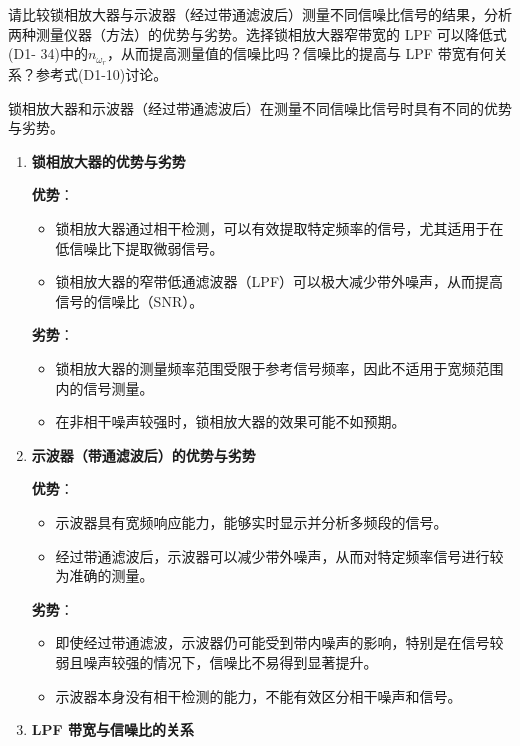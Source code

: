\documentclass[dvipsnames, svgnames,a4paper,11pt]{article}
\begin{document}
\begin{question}
	请比较锁相放大器与示波器（经过带通滤波后）测量不同信噪比信号的结果，分析两种测量仪器（方法）的优势与劣势。选择锁相放大器窄带宽的 LPF 可以降低式(D1- 34)中的$n_{\omega_r}$，从而提高测量值的信噪比吗？信噪比的提高与 LPF 带宽有何关系？参考式(D1-10)讨论。
\end{question}

	锁相放大器和示波器（经过带通滤波后）在测量不同信噪比信号时具有不同的优势与劣势。

	\begin{enumerate}

		\item \textbf{锁相放大器的优势与劣势}

		\textbf{优势}：
		\begin{itemize}
			\item 锁相放大器通过相干检测，可以有效提取特定频率的信号，尤其适用于在低信噪比下提取微弱信号。
			\item 锁相放大器的窄带低通滤波器（LPF）可以极大减少带外噪声，从而提高信号的信噪比（SNR）。
		\end{itemize}

		\textbf{劣势}：
		\begin{itemize}
			\item 锁相放大器的测量频率范围受限于参考信号频率，因此不适用于宽频范围内的信号测量。
			\item 在非相干噪声较强时，锁相放大器的效果可能不如预期。
		\end{itemize}

		\item \textbf{示波器（带通滤波后）的优势与劣势}

		\textbf{优势}：
		\begin{itemize}
			\item 示波器具有宽频响应能力，能够实时显示并分析多频段的信号。
			\item 经过带通滤波后，示波器可以减少带外噪声，从而对特定频率信号进行较为准确的测量。
		\end{itemize}

		\textbf{劣势}：
		\begin{itemize}
			\item 即使经过带通滤波，示波器仍可能受到带内噪声的影响，特别是在信号较弱且噪声较强的情况下，信噪比不易得到显著提升。
			\item 示波器本身没有相干检测的能力，不能有效区分相干噪声和信号。
		\end{itemize}

		\item \textbf{LPF 带宽与信噪比的关系}


\end{enumerate}
\end{document}
